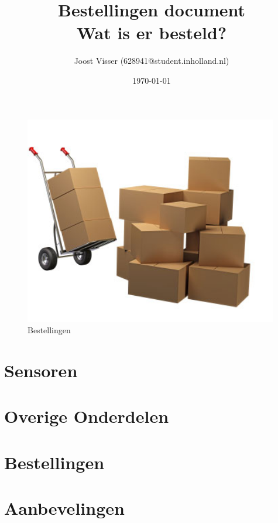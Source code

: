 \documentclass{article}
\title{\LARGE{Bestellingen document}\\\normalsize{Wat is er besteld?}}
\author{Joost Visser (628941@student.inholland.nl)}
\date{\today}
\newcommand{\contents} {
  {
    \hypersetup{hidelinks}
    \tableofcontents
  }
  \clearpage
}
\begin{document}
    \maketitle
    \vspace{8em}
    \begin{figure}[H]
        \centering
        \includegraphics[width=30em]{fotos/cover.jpg}
        \caption[]{Bestellingen}
    \end{figure}
    \vfill
    \newpage

    \contents
    

    \begin{flushleft}

    \section{Sensoren}
    \label{sec:Sensoren}
    
     
    \section{Overige Onderdelen}
    \label{sec:overige_onderdelen}
    
    
    \section{Bestellingen}
    \label{sec:Bestellingen}
    

    \section{Aanbevelingen}
    \label{sec:Aanbevelingen}
    

    \end{flushleft}
\end{document}
